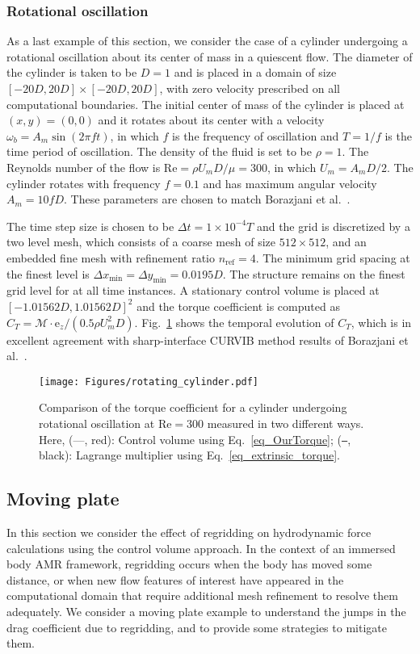 \documentclass[review]{elsarticle}
\renewcommand{\vec}[1]{\bm{\mathrm{#1}}}
\def \e{\vec{e}}
\def \cM{\vec{\mathcal{M}}}
\def \e{\vec{e}}
\def \nref{n_{\text{ref}}}
\def \Re{\text{Re}}
\def \dx{\Delta x}
\def \dy{\Delta y}
\def \dx{\Delta x}
\begin{document}
\subsubsection{Rotational oscillation}
As a last example of this section, we consider the case of a cylinder undergoing a rotational 
oscillation about its center of mass in a quiescent flow. The diameter of the cylinder is taken to 
be $D = 1$ and is placed in a domain of size $[-20D, 20D] \times [-20D, 20D]$, with zero velocity 
prescribed on all computational boundaries. The initial center of mass of the cylinder is placed 
at $(x,y) = (0,0)$ and it rotates about its center with a velocity $\omega_b = A_m \sin(2 \pi f t)$, 
in which $f$ is the frequency of oscillation and $T = 1/f$ is the time period of oscillation.
The density of the fluid is set to be $\rho = 1$.
The Reynolds number of the flow is $\Re = \rho U_m D/\mu = 300$, in which $U_m = A_m D/2$. The cylinder
rotates with frequency $f = 0.1$ and has maximum angular velocity $A_m = 10 f D$. These parameters are
chosen to match Borazjani et al.~\cite{Borazjani13}.

The time step size is chosen to be $\Delta t = 1\times 10^{-4} T$ and the grid is discretized by a two level
mesh, which consists of a coarse mesh of size $512 \times 512$, and an embedded fine mesh with 
refinement ratio $\nref = 4$. The minimum grid spacing at the finest level is 
$\dx_\textrm{min} = \dy_\textrm{min} = 0.0195D$. The structure remains on the finest grid level for at all time instances. 
A stationary control volume is placed at $[-1.01562D,1.01562D]^2$ and the torque coefficient is computed
as $C_T = \cM \cdot \e_z/(0.5 \rho U_m^2 D)$. Fig.~\ref{fig_rotating_cylinder} shows the temporal evolution
of $C_T$, which is in excellent agreement with sharp-interface CURVIB method results of Borazjani et 
al.~\cite{Borazjani13}.

\begin{figure}[H]
  \centering
    \texttt{[image: Figures/rotating\_cylinder.pdf]}
  \caption{Comparison of the torque coefficient for a cylinder undergoing 
  rotational oscillation at $\Re = 300$ measured in two different ways.
   Here, (---, red): Control volume using Eq.~\eqref{eq_OurTorque};
     (\texttt{---}, black): Lagrange multiplier using Eq.~\eqref{eq_extrinsic_torque}.}
  \label{fig_rotating_cylinder}
\end{figure}

\subsection{Moving plate}
In this section we consider the effect of regridding on hydrodynamic force calculations 
using the control volume approach. In the context of an immersed body AMR framework, 
regridding occurs when the body has moved some distance, or when new flow 
features of interest have appeared in the computational domain that require additional
mesh refinement to resolve them adequately.  We consider a moving plate example to 
understand the jumps in the drag coefficient due to regridding, and to provide 
some strategies to mitigate them.
 
\end{document}
